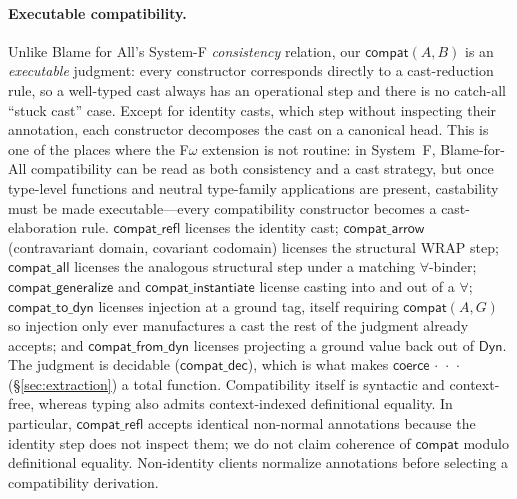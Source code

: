 \documentclass[acmsmall,anonymous=false,nonacm]{acmart}
\newcommand{\dyn}{\ensuremath{\mathsf{Dyn}}}
\newcommand{\coerce}[3]{\mathsf{coerce}\,#1\,#2\,#3}
\begin{document}
\paragraph{Executable compatibility.}
Unlike Blame for All's System-F \emph{consistency} relation, our $\mathsf{compat}(A,B)$
is an \emph{executable} judgment: every constructor corresponds directly to a
cast-reduction rule, so a well-typed cast always has an operational step and
there is no catch-all ``stuck cast'' case. Except for identity casts, which
step without inspecting their annotation, each constructor decomposes the cast
on a canonical head. This is one of the places where the F$\omega$ extension is not routine: in
System~F, Blame-for-All compatibility can be read as both consistency and a cast
strategy, but once type-level functions and neutral type-family applications are
present, castability must be made executable---every compatibility constructor
becomes a cast-elaboration rule. $\mathsf{compat\_refl}$
licenses the identity cast; $\mathsf{compat\_arrow}$ (contravariant domain,
covariant codomain) licenses the structural WRAP step; $\mathsf{compat\_all}$
licenses the analogous structural step under a matching $\forall$-binder;
$\mathsf{compat\_generalize}$ and $\mathsf{compat\_instantiate}$ license casting
into and out of a $\forall$; $\mathsf{compat\_to\_dyn}$ licenses injection at a
ground tag, itself requiring $\mathsf{compat}(A,G)$ so injection only ever
manufactures a cast the rest of the judgment already accepts; and
$\mathsf{compat\_from\_dyn}$ licenses projecting a ground value back out of
$\dyn$. The judgment is decidable ($\mathsf{compat\_dec}$), which is what makes
$\coerce{\cdot}{\cdot}{\cdot}$ (\S\ref{sec:extraction}) a total function.
Compatibility itself is syntactic and context-free, whereas typing also admits
context-indexed definitional equality. In particular,
$\mathsf{compat\_refl}$ accepts identical non-normal annotations because the
identity step does not inspect them; we do not claim coherence of
$\mathsf{compat}$ modulo definitional equality. Non-identity clients normalize
annotations before selecting a compatibility derivation.
\end{document}
